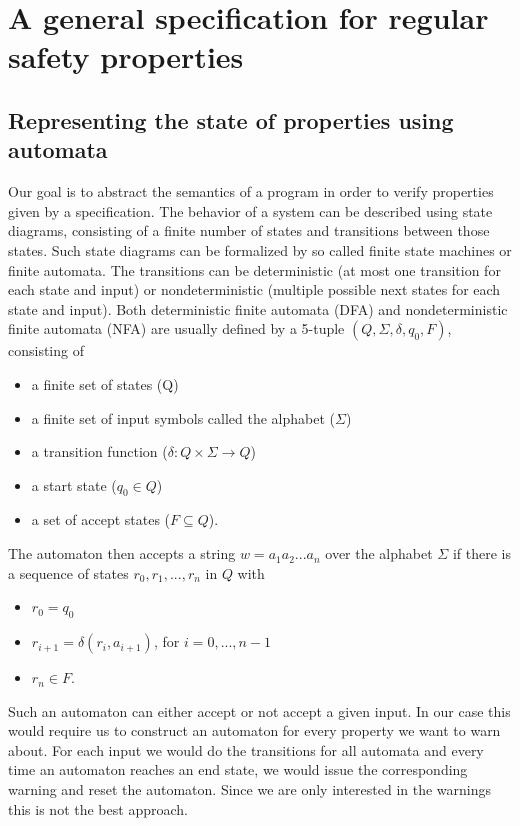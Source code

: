 \chapter{A general specification for regular safety properties}
\section{Representing the state of properties using automata}
Our goal is to abstract the semantics of a program in order to verify properties given by a specification.
The behavior of a system can be described using state diagrams, consisting of a finite number of states and transitions between those states.
Such state diagrams can be formalized by so called finite state machines or finite automata.
The transitions can be deterministic (at most one transition for each state and input) or nondeterministic (multiple possible next states for each state and input).
Both deterministic finite automata (DFA) and nondeterministic finite automata (NFA) are usually defined by a 5-tuple $(Q, \Sigma, \delta, q_0, F)$, consisting of
\begin{itemize}
\item a finite set of states (Q)
\item a finite set of input symbols called the alphabet ($\Sigma$)
\item a transition function ($\delta : Q \times \Sigma \rightarrow Q$)
\item a start state ($q_0 \in Q$)
\item a set of accept states ($F \subseteq Q$).
\end{itemize}
The automaton then accepts a string $w = a_1 a_2 ... a_n$ over the alphabet $\Sigma$ if there is a sequence of states $r_0, r_1, ..., r_n$ in $Q$ with
\begin{itemize}
\item $r_0 = q_0$
\item $r_{i+1} = \delta(r_i, a_{i+1})$, for $i=0, ..., n-1$
\item $r_n \in F$.
\end{itemize}
Such an automaton can either accept or not accept a given input. In our case this would require us to construct an automaton for every property we want to warn about. For each input we would do the transitions for all automata and every time an automaton reaches an end state, we would issue the corresponding warning and reset the automaton. Since we are only interested in the warnings this is not the best approach.

